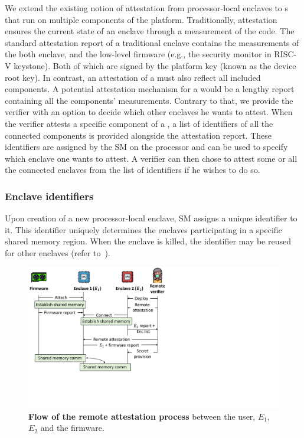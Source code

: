 We extend the existing notion of attestation from processor-local enclaves to \nameenclave{}s that run on multiple components of the platform. Traditionally, attestation ensures the current state of an enclave through a measurement of the code. The standard attestation report of a traditional enclave contains the measurements of the both enclave, and the low-level firmware (e.g., the security monitor in RISC-V keystone). Both of which are signed by the platform key (known as the device root key). In contrast, an attestation of a \nameenclave{} must also reflect all included components. 
A potential attestation mechanism for a \nameenclave{} would be a lengthy report containing all the components' measurements. %
Contrary to that, we provide the verifier with an option to decide which other enclaves he wants to attest. When the verifier attests a specific component of a \nameenclave, a list of identifiers of all the connected components is provided alongside the attestation report. These identifiers are assigned by the SM on the processor and can be used to specify which enclave one wants to attest. A verifier can then chose to attest some or all the connected enclaves from the list of identifiers if he wishes to do so.


\subsubsection{Enclave identifiers} 
Upon creation of a new processor-local enclave, SM assigns a unique identifier to it. This identifier uniquely determines the enclaves participating in a specific shared memory region. When the enclave is killed, the identifier may be reused for other enclaves (refer to~).


\begin{figure}[t]
  \centering
  \includegraphics[trim={0 5cm 15cm 0}, clip, width=.8\linewidth]{chapters/PIE/images/localAttestation.pdf}
  \caption[Flow of remote attestation process between \nameenclave{}'s components]{\textbf{Flow of the remote attestation process} between the user, $E_1$, $E_2$ and the \sphw firmware.} %
  \label{fig:attestationFlow}
\end{figure}

